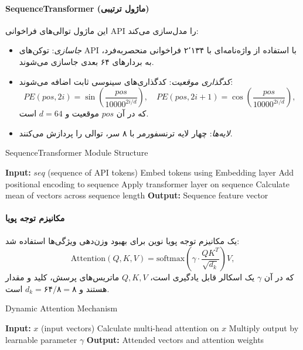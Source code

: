 \paragraph{SequenceTransformer (ماژول ترتیبی)}
این ماژول توالی‌های فراخوانی API را مدل‌سازی می‌کند:
\begin{itemize}
    \item \textit{جاسازی}: توکن‌های API با استفاده از واژه‌نامه‌ای با ۲٬۱۳۴ فراخوانی منحصربه‌فرد، به بردارهای ۶۴ بعدی جاسازی می‌شوند.
    \item \textit{کدگذاری موقعیت}: کدگذاری‌های سینوسی ثابت اضافه می‌شوند:
    \[
    PE(pos, 2i) = \sin\left(\frac{pos}{10000^{2i/d}}\right), \quad PE(pos, 2i+1) = \cos\left(\frac{pos}{10000^{2i/d}}\right),
    \]
    که در آن \( pos \) موقعیت و \( d = 64 \) است.
    \item \textit{لایه‌ها}: چهار لایه ترنسفورمر با ۸ سر، توالی را پردازش می‌کنند.
\end{itemize}
\begin{LTR}
\begin{algorithm}[h]
\caption{SequenceTransformer Module Structure}
\begin{algorithmic}[1]
\STATE \textbf{Input:} $seq$ (sequence of API tokens)
\STATE Embed tokens using Embedding layer
\STATE Add positional encoding to sequence
    \STATE Apply transformer layer on sequence
\ENDFOR
\STATE Calculate mean of vectors across sequence length
\STATE \textbf{Output:} Sequence feature vector
\end{algorithmic}
\end{algorithm}
\end{LTR}

\paragraph{مکانیزم توجه پویا} \label{sec:dynamic_attention}
یک مکانیزم توجه پویا نوین برای بهبود وزن‌دهی ویژگی‌ها استفاده شد:
\[
\text{Attention}(Q, K, V) = \text{softmax}\left(\gamma \cdot \frac{Q K^T}{\sqrt{d_k}}\right) V,
\]
که در آن \( \gamma \) یک اسکالر قابل یادگیری است، \( Q, K, V \) ماتریس‌های پرسش، کلید و مقدار هستند و \( d_k = ۶۴/۸ = ۸ \) است.
\begin{LTR}
\begin{algorithm}[h]
\caption{Dynamic Attention Mechanism}
\begin{algorithmic}[1]
\STATE \textbf{Input:} $x$ (input vectors)
\STATE Calculate multi-head attention on $x$
\STATE Multiply output by learnable parameter $\gamma$
\STATE \textbf{Output:} Attended vectors and attention weights
\end{algorithmic}
\end{algorithm}
\end{LTR}

